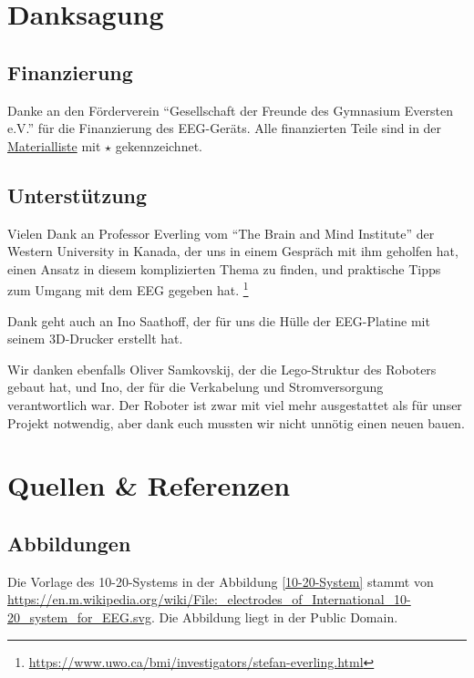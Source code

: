 \documentclass[11pt]{scrartcl}
\begin{document}
	\section{Danksagung}

	\subsection{Finanzierung} \label{Foerderverein}

	Danke an den Förderverein \enquote{Gesellschaft der Freunde des Gymnasium Eversten e.V.} für die Finanzierung des EEG-Geräts. Alle finanzierten Teile sind in der \hyperref[Materialien]{Materialliste} mit $\star$ gekennzeichnet. 

	\subsection{Unterstützung} \label{Unterstuetzung}

	Vielen Dank an Professor Everling vom \enquote{The Brain and Mind Institute} der Western University in Kanada, der uns in einem Gespräch mit ihm geholfen hat, einen Ansatz in diesem komplizierten Thema zu finden, und praktische Tipps zum Umgang mit dem EEG gegeben hat. \footnote{\href{https://www.uwo.ca/bmi/investigators/stefan-everling.html}{https://www.uwo.ca/bmi/investigators/stefan-everling.html}}

	Dank geht auch an Ino Saathoff, der für uns die Hülle der EEG-Platine mit seinem 3D-Drucker erstellt hat.

	Wir danken ebenfalls Oliver Samkovskij, der die Lego-Struktur des Roboters gebaut hat, und Ino, der für die Verkabelung und Stromversorgung verantwortlich war. Der Roboter ist zwar mit viel mehr ausgestattet als für unser Projekt notwendig, aber dank euch mussten wir nicht unnötig einen neuen bauen.

	\section{Quellen \& Referenzen}

	\subsection{Abbildungen}

	Die Vorlage des 10-20-Systems in der Abbildung \ref{10-20-System} stammt von \href{https://en.m.wikipedia.org/wiki/File:21\_electrodes\_of\_International\_10-20\_system\_for\_EEG.svg}{https://en.m.wikipedia.org/wiki/\-File:\_\-electrodes\_of\_International\_10-20\_system\_for\_EEG.svg}. Die Abbildung liegt in der Public Domain.
	
\end{document}
